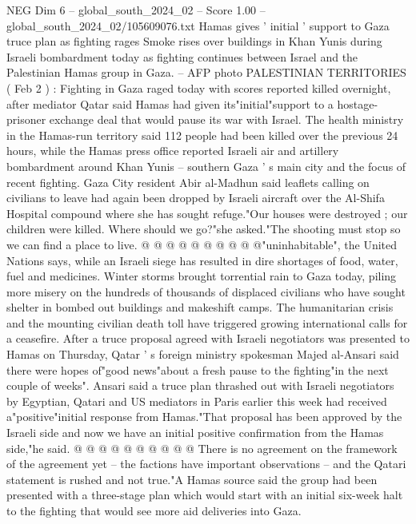\begin{textsample}{NEG Dim 6 – global\_south\_2024\_02 – Score 1.00 – global\_south\_2024\_02/105609076.txt}  \label{ex:f6_neg_278}
Hamas gives ' initial ' support to Gaza truce plan as fighting rages Smoke rises over buildings in Khan Yunis during Israeli bombardment today as fighting continues between Israel and the Palestinian Hamas group in Gaza. -- AFP photo PALESTINIAN TERRITORIES ( Feb 2 ) : Fighting in Gaza raged today with scores reported killed overnight, after mediator Qatar said Hamas had given its"initial"support to a hostage-prisoner exchange deal that would pause its war with Israel.
The health ministry in the Hamas-run territory said 112 people had been killed over the previous 24 hours, while the Hamas press office reported Israeli air and artillery bombardment around Khan Yunis -- southern Gaza ' s main city and the focus of recent fighting.
Gaza City resident Abir al-Madhun said leaflets calling on civilians to leave had again been dropped by Israeli aircraft over the Al-Shifa Hospital compound where she has sought refuge."Our houses were destroyed ; our children were killed.
Where should we go?"she asked."The shooting must stop so we can find a place to live. @ @ @ @ @ @ @ @ @ @"uninhabitable", the United Nations says, while an Israeli siege has resulted in dire shortages of food, water, fuel and medicines.
Winter storms brought torrential rain to Gaza today, piling more misery on the hundreds of thousands of displaced civilians who have sought shelter in bombed out buildings and makeshift camps.
The humanitarian crisis and the mounting civilian death toll have triggered growing international calls for a ceasefire.
After a truce proposal agreed with Israeli negotiators was presented to Hamas on Thursday, Qatar ' s foreign ministry spokesman Majed al-Ansari said there were hopes of"good news"about a fresh pause to the fighting"in the next couple of weeks".
Ansari said a truce plan thrashed out with Israeli negotiators by Egyptian, Qatari and US mediators in Paris earlier this week had received a"positive"initial response from Hamas."That proposal has been approved by the Israeli side and now we have an initial positive confirmation from the Hamas side,"he said. @ @ @ @ @ @ @ @ @ @ There is no agreement on the framework of the agreement yet -- the factions have important observations -- and the Qatari statement is rushed and not true."A Hamas source said the group had been presented with a three-stage plan which would start with an initial six-week halt to the fighting that would see more aid deliveries into Gaza.

\end{textsample}
